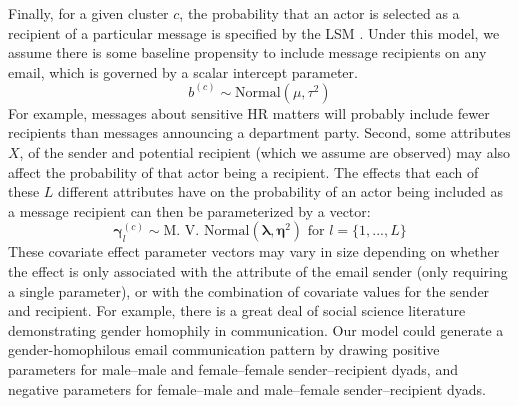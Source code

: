 \documentclass{pnastwo}
\begin{document}
\begin{article}
Finally, for a given cluster $c$, the probability that an actor is selected as a recipient of a particular message is specified by the LSM \citep{Hoff2002a}. Under this model, we assume there is some baseline propensity to include message recipients on any email, which is governed by a scalar intercept parameter.
\begin{equation}
	b^{(c)} \sim \text{Normal}(\mu, \tau^2)
\end{equation} 
For example, messages about sensitive HR matters will probably include fewer recipients than messages announcing a department party. Second, some attributes $X$, of the sender and potential recipient (which we assume are observed) may also affect the probability of that actor being a recipient. The effects that each of these $L$ different attributes have on the probability of an actor being included as a message recipient can then be parameterized by a vector: 
\begin{equation}
	\mathbf{\gamma}_l^{(c)} \sim \text{M. V. Normal}(\mathbf{\lambda}, \mathbf{\eta}^2) \text{ for } l = \{1, ..., L\}
\end{equation}
These covariate effect parameter vectors may vary in size depending on whether the effect is only associated with the attribute of the email sender (only requiring a single parameter), or with the combination of covariate values for the sender and recipient. For example, there is a great deal of social science literature demonstrating gender homophily in communication. Our model could generate a gender-homophilous email communication pattern by drawing positive parameters for male--male and female--female sender--recipient dyads, and negative parameters for female--male and male--female sender--recipient dyads. 


\end{article}
\end{document}
